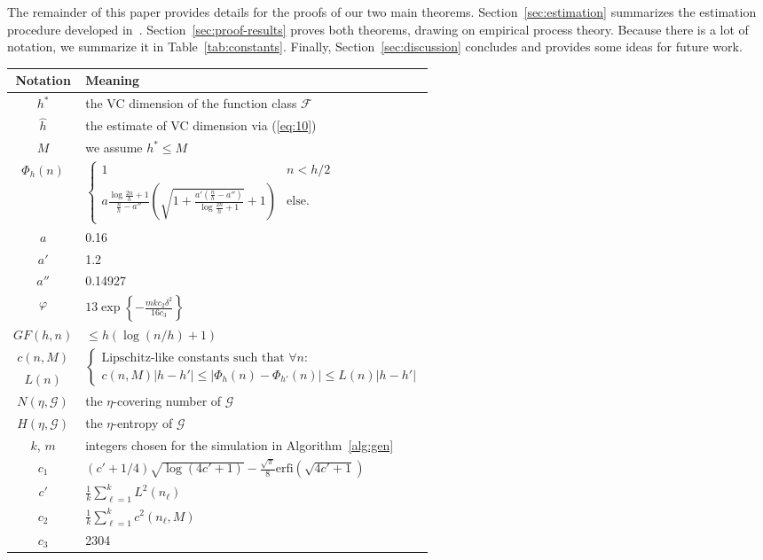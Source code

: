 \documentclass[11pt]{article}
\newcommand{\F}{\mathcal{F}}
\newcommand{\G}{\mathcal{G}}
\renewcommand{\eqref}[1]{(\ref{eq:#1})}
\renewcommand{\hat}[1]{\widehat{#1}}
\begin{document}
The remainder of this paper provides details for the proofs of our two main
theorems. Section~\ref{sec:estimation} summarizes the estimation procedure
developed in~\citet{VapnikLevin1994}. Section~\ref{sec:proof-results} proves
both theorems, drawing on empirical process theory. Because there is a lot of
notation, we summarize it in Table~\ref{tab:constants}. Finally,
Section~\ref{sec:discussion} concludes and provides some ideas for future work.
\begin{table*}[t!]
  \centering
  \caption{Constants and important notation}  
  \begin{tabular}{|cl|}
    \hline\hline
    Notation & Meaning\\
    \hline
    $h^*$ & the VC dimension of the function class $\F$\\
    $\hat{h}$ & the estimate of VC dimension via \eqref{10}\\
    $M$ & we assume $h^* \leq M$\\
    $\Phi_h(n)$& $\begin{cases} 1 & n < h/2\\ a\frac{\log\frac{2n}{h}+1}{\frac{n}{h} -
        a''} \left( \sqrt{ 1+
          \frac{a'\left(\frac{n}{h}-a''\right)}{\log\frac{2n}{h}+1}} +
        1\right) & \mbox{else}.
    \end{cases}$\\
    $a$& 0.16\\
    $a'$& 1.2\\
    $a''$& 0.14927\\
    $\varphi$ & $\displaystyle 13\exp\left\{-\frac{mkc_2\delta^2}{16c_3}\right\}$\\
    $GF(h,n)$ & $\leq h(\log(n/h) +1)$\\
    $c(n,M)$ & \multirow{2}{*}{$\begin{cases} \mbox{Lipschitz-like constants such that $\forall n$:} \\ c(n,M)|h-h'| \leq
        |\Phi_h(n)-\Phi_{h'}(n)| \leq L(n)|h-h'|\end{cases}$}\\
    $L(n)$ & \\
    $N(\eta,\G)$ &the $\eta$-covering number of $\G$\\
    $H(\eta,\G)$ &the $\eta$-entropy of $\G$\\
    $k$, $m$ & integers chosen for the simulation in Algorithm~\ref{alg:gen}\\
    $c_1$ &$\displaystyle (c'+1/4)\sqrt{\log (4c'+1)} -
    \frac{\sqrt{\pi}}{8}\mbox{erfi}(\sqrt{4c'+1} )$\\
    $c'$ & $\displaystyle \frac{1}{k} \sum_{\ell=1}^k L^2(n_\ell)$\\
    $c_2$ & $\displaystyle \frac{1}{k} \sum_{\ell=1}^k c^2(n_\ell,M)$\\
    $c_3$ & 2304\\
    \hline\hline
  \end{tabular}
  \label{tab:constants}
\end{table*}
\end{document}
